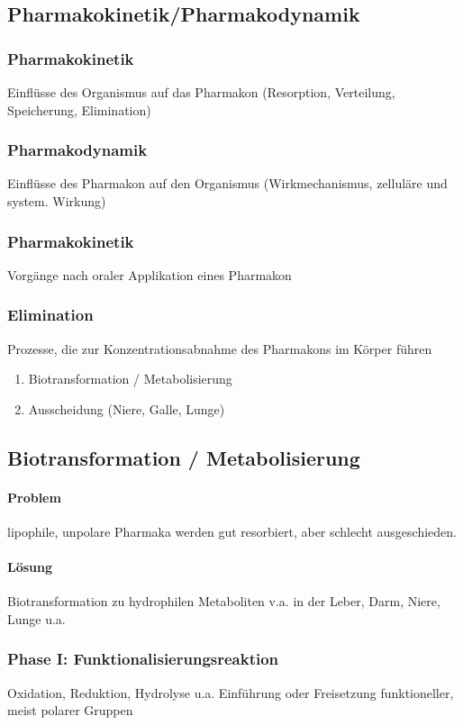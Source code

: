 \documentclass[10pt,a4paper]{report}
\begin{document}
\subsection{Pharmakokinetik/Pharmakodynamik}
\subsubsection{Pharmakokinetik} 	Einflüsse des Organismus auf das Pharmakon (Resorption, Verteilung, Speicherung, Elimination)
\subsubsection{Pharmakodynamik} Einflüsse des Pharmakon auf den Organismus (Wirkmechanismus, zelluläre und system. Wirkung)
\subsubsection{Pharmakokinetik}  Vorgänge nach oraler Applikation eines Pharmakon
\subsubsection{Elimination} Prozesse, die zur Konzentrationsabnahme des Pharmakons im Körper führen
\begin{enumerate}
	\item Biotransformation / Metabolisierung
	\item Ausscheidung (Niere, Galle, Lunge)
\end{enumerate}
\subsection{Biotransformation / Metabolisierung}
\paragraph{Problem} lipophile, unpolare Pharmaka werden gut resorbiert, aber schlecht 	ausgeschieden. 
\paragraph{Lösung} Biotransformation zu hydrophilen Metaboliten v.a. in der Leber, Darm, Niere, Lunge u.a.

\subsubsection{Phase I: 	Funktionalisierungsreaktion}
Oxidation, Reduktion, Hydrolyse u.a. 
Einführung oder Freisetzung funktioneller, meist polarer Gruppen 
\end{document}
